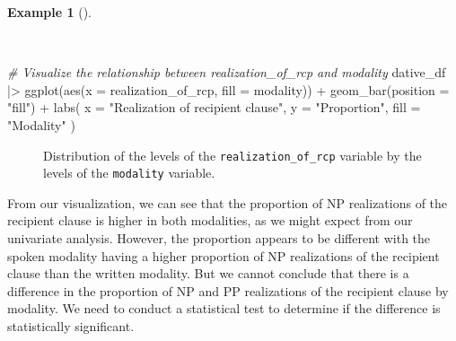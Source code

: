 \documentclass[
  letterpaper,
  DIV=11,
  numbers=noendperiod]{scrreprt}
\newenvironment{Shaded}{\begin{snugshade}}{\end{snugshade}}
\newcommand{\AttributeTok}[1]{\textcolor[rgb]{0.00,0.00,0.00}{#1}}
\newcommand{\CommentTok}[1]{\textcolor[rgb]{0.00,0.00,0.00}{\textit{#1}}}
\newcommand{\FunctionTok}[1]{\textcolor[rgb]{0.00,0.00,0.00}{#1}}
\newcommand{\NormalTok}[1]{\textcolor[rgb]{0.00,0.00,0.00}{#1}}
\newcommand{\SpecialCharTok}[1]{\textcolor[rgb]{0.00,0.00,0.00}{#1}}
\newcommand{\StringTok}[1]{\textcolor[rgb]{0.00,0.00,0.00}{#1}}
\theoremstyle{definition}
\newtheorem{example}{Example}[chapter]
\theoremstyle{remark}
\begin{document}
\begin{example}[]\protect\hypertarget{exm-ida-cat-bivariate-vis}{}\label{exm-ida-cat-bivariate-vis}

~

\begin{Shaded}
\begin{Highlighting}[]
\CommentTok{\# Visualize the relationship between \textasciigrave{}realization\_of\_rcp\textasciigrave{} and \textasciigrave{}modality\textasciigrave{}}
\NormalTok{dative\_df }\SpecialCharTok{|\textgreater{}}
  \FunctionTok{ggplot}\NormalTok{(}\FunctionTok{aes}\NormalTok{(}\AttributeTok{x =}\NormalTok{ realization\_of\_rcp, }\AttributeTok{fill =}\NormalTok{ modality)) }\SpecialCharTok{+}
  \FunctionTok{geom\_bar}\NormalTok{(}\AttributeTok{position =} \StringTok{"fill"}\NormalTok{) }\SpecialCharTok{+}
  \FunctionTok{labs}\NormalTok{(}
    \AttributeTok{x =} \StringTok{"Realization of recipient clause"}\NormalTok{,}
    \AttributeTok{y =} \StringTok{"Proportion"}\NormalTok{,}
    \AttributeTok{fill =} \StringTok{"Modality"}
\NormalTok{  )}
\end{Highlighting}
\end{Shaded}

\begin{figure}[H]


\caption{\label{fig-ida-cat-bivariate}Distribution of the levels of the
\texttt{realization\_of\_rcp} variable by the levels of the
\texttt{modality} variable.}

\end{figure}%

\end{example}

From our visualization, we can see that the proportion of NP
realizations of the recipient clause is higher in both modalities, as we
might expect from our univariate analysis. However, the proportion
appears to be different with the spoken modality having a higher
proportion of NP realizations of the recipient clause than the written
modality. But we cannot conclude that there is a difference in the
proportion of NP and PP realizations of the recipient clause by
modality. We need to conduct a statistical test to determine if the
difference is statistically significant.
\end{document}
